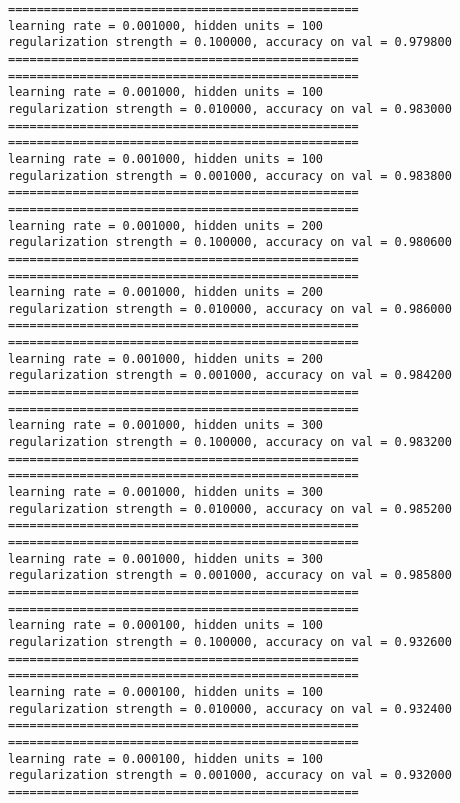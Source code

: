 \documentclass[11pt]{article}
\begin{document}
    \begin{Verbatim}[commandchars=\\\{\}]
=================================================
learning rate = 0.001000, hidden units = 100
regularization strength = 0.100000, accuracy on val = 0.979800
=================================================
=================================================
learning rate = 0.001000, hidden units = 100
regularization strength = 0.010000, accuracy on val = 0.983000
=================================================
=================================================
learning rate = 0.001000, hidden units = 100
regularization strength = 0.001000, accuracy on val = 0.983800
=================================================
=================================================
learning rate = 0.001000, hidden units = 200
regularization strength = 0.100000, accuracy on val = 0.980600
=================================================
=================================================
learning rate = 0.001000, hidden units = 200
regularization strength = 0.010000, accuracy on val = 0.986000
=================================================
=================================================
learning rate = 0.001000, hidden units = 200
regularization strength = 0.001000, accuracy on val = 0.984200
=================================================
=================================================
learning rate = 0.001000, hidden units = 300
regularization strength = 0.100000, accuracy on val = 0.983200
=================================================
=================================================
learning rate = 0.001000, hidden units = 300
regularization strength = 0.010000, accuracy on val = 0.985200
=================================================
=================================================
learning rate = 0.001000, hidden units = 300
regularization strength = 0.001000, accuracy on val = 0.985800
=================================================
=================================================
learning rate = 0.000100, hidden units = 100
regularization strength = 0.100000, accuracy on val = 0.932600
=================================================
=================================================
learning rate = 0.000100, hidden units = 100
regularization strength = 0.010000, accuracy on val = 0.932400
=================================================
=================================================
learning rate = 0.000100, hidden units = 100
regularization strength = 0.001000, accuracy on val = 0.932000
=================================================

\end{Verbatim}
\end{document}
